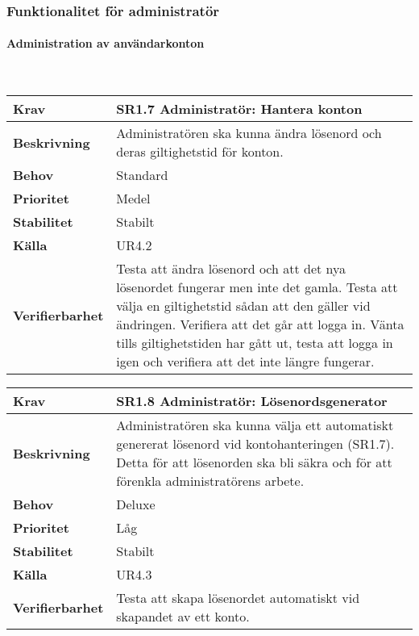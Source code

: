 \documentclass[a4paper, twoside, 11pt, titlepage]{article}
\begin{document}
		\subsubsection{Funktionalitet för administratör}



			\paragraph{Administration av användarkonton}\

			\begin {table} [ht] \begin{tabular} { p{2.6cm} p{12.5cm} }
				\hline
				\sffamily\textbf{Krav} & \sffamily\textbf{SR1.7 Administratör: Hantera konton } \\
				\hline
				\sffamily\textbf{Beskrivning} & Administratören ska kunna ändra lösenord och deras giltighetstid för konton.  \\
				\hline
				\sffamily\textbf{Behov} & Standard  \\
				\hline
				\sffamily\textbf{Prioritet} & Medel  \\
				\hline
				\sffamily\textbf{Stabilitet} & Stabilt  \\
				\hline
				\sffamily\textbf{Källa} & UR4.2  \\
				\hline
				\sffamily\textbf{Verifierbarhet} & Testa att ändra lösenord och att det nya lösenordet fungerar men inte det gamla. Testa att välja en giltighetstid sådan att den gäller vid ändringen. Verifiera att det går att logga in. Vänta tills giltighetstiden har gått ut, testa att logga in igen och verifiera att det inte längre fungerar.  \\
				\hline
			\end{tabular} \end{table} \FloatBarrier
			\vspace{6mm}

			\begin {table} [ht] \begin{tabular} { p{2.6cm} p{12.5cm} }
				\hline
				\sffamily\textbf{Krav} & \sffamily\textbf{SR1.8 Administratör: Lösenordsgenerator } \\
				\hline
				\sffamily\textbf{Beskrivning} & Administratören ska kunna välja ett automatiskt genererat lösenord vid kontohanteringen (SR1.7). Detta för att lösenorden ska bli säkra och för att förenkla administratörens arbete.  \\
				\hline
				\sffamily\textbf{Behov} & Deluxe  \\
				\hline
				\sffamily\textbf{Prioritet} & Låg  \\
				\hline
				\sffamily\textbf{Stabilitet} & Stabilt  \\
				\hline
				\sffamily\textbf{Källa} & UR4.3  \\
				\hline
				\sffamily\textbf{Verifierbarhet} & Testa att skapa lösenordet automatiskt vid skapandet av ett konto.  \\
				\hline
			\end{tabular} \end{table} \FloatBarrier
\end{document}
